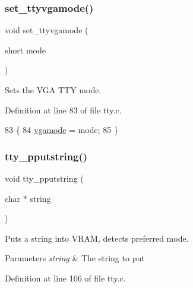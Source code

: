 \subsubsection{\texorpdfstring{set\+\_\+ttyvgamode()}{set\_ttyvgamode()}}
{\footnotesize\ttfamily void set\+\_\+ttyvgamode (\begin{DoxyParamCaption}\item[{short}]{mode }\end{DoxyParamCaption})}



Sets the V\+GA T\+TY mode. 



Definition at line 83 of file tty.\+c.


\begin{DoxyCode}
83                                 \{
84     \hyperlink{a00173_af93b0649fdd1bea5b6d29ed37205aa2c_af93b0649fdd1bea5b6d29ed37205aa2c}{vgamode} = mode;
85 \}
\end{DoxyCode}
\mbox{\label{a00176_ade960b1320324706aac6c00cc6b1b2fe_ade960b1320324706aac6c00cc6b1b2fe}} 
\subsubsection{\texorpdfstring{tty\+\_\+pputstring()}{tty\_pputstring()}}
{\footnotesize\ttfamily void tty\+\_\+pputstring (\begin{DoxyParamCaption}\item[{char $\ast$}]{string }\end{DoxyParamCaption})}



Puts a string into V\+R\+AM, detects preferred mode. 


\begin{DoxyParams}{Parameters}
{\em string} & The string to put \\
\hline
\end{DoxyParams}


Definition at line 106 of file tty.\+c.


